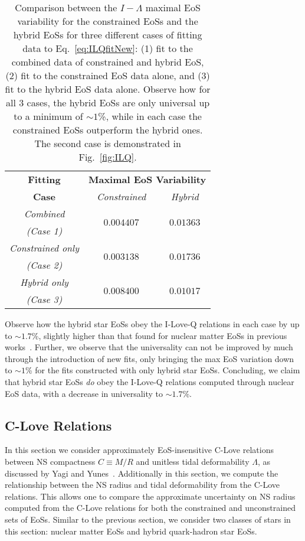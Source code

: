\documentclass[prd,twocolumn,nofootinbib,superscriptaddress,amsmath,amssymb]{revtex4-1}
\begin{document}
\begin{table}
\centering
\caption{
Comparison between the $I-\Lambda$ maximal EoS variability for the constrained EoSs and the hybrid EoSs for three different cases of fitting data to Eq.~\ref{eq:ILQfitNew}: (1) fit to the combined data of constrained and hybrid EoS, (2) fit to the constrained EoS data alone, and (3) fit to the hybrid EoS data alone.
Observe how for all 3 cases, the hybrid EoSs are only universal up to a minimum of $\sim1$\%, while in each case the constrained EoSs outperform the hybrid ones.
The second case is demonstrated in Fig.~\ref{fig:ILQ}.
}\label{tab:hybridCompare}
\begin{tabular}{ c  || c c } 
 \hline
 \hline
 \textbf{Fitting} & \multicolumn{2}{c}{\textbf{Maximal EoS Variability}} \\
 \cline{2-3}
 \textbf{Case} &  \multicolumn{1}{c|}{\emph{Constrained}} & \emph{Hybrid}\\
 \hline
 \emph{Combined} &  \multirow{2}{*}{$0.004407$} & \multirow{2}{*}{$0.01363$}\\
 \emph{(Case 1)} & &\\
 \cline{1-1}
 \emph{Constrained only} & \multirow{2}{*}{$0.003138$} & \multirow{2}{*}{$0.01736$}\\
  \emph{(Case 2)} & &\\
  \cline{1-1}
 \emph{Hybrid only} & \multirow{2}{*}{$0.008400$} & \multirow{2}{*}{$0.01017$}\\
  \emph{(Case 3)} & &\\
  \cline{1-1}
\hline
\hline
\end{tabular}
\end{table}

Observe how the hybrid star EoSs obey the I-Love-Q relations in each case by up to $\sim1.7$\%, slightly higher than that found for nuclear matter EoSs in previous works~\cite{Yagi:ILQ}.
Further, we observe that the universality can not be improved by much through the introduction of new fits, only bringing the max EoS variation down to $\sim1$\% for the fits constructed with only hybrid star EoSs.
Concluding, we claim that hybrid star EoSs \emph{do} obey the I-Love-Q relations computed through nuclear EoS data, with a decrease in universality to $\sim1.7$\%.  

\subsection{C-Love Relations}\label{sec:clove}
In this section we consider approximately EoS-insensitive C-Love relations between NS compactness $C \equiv M/R$ and unitless tidal deformability $\Lambda$, as discussed by Yagi and Yunes~\cite{Yagi:binLove}.
Additionally in this section, we compute the relationship between the NS radius and tidal deformability from the C-Love relations.
This allows one to compare the approximate uncertainty on NS radius computed from the C-Love relations for both the constrained and unconstrained sets of EoSs. 
Similar to the previous section, we consider two classes of stars in this section: nuclear matter EoSs and hybrid quark-hadron star EoSs.
\end{document}
